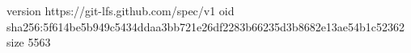version https://git-lfs.github.com/spec/v1
oid sha256:5f614be5b949c5434ddaa3bb721e26df2283b66235d3b8682e13ae54b1c52362
size 5563
